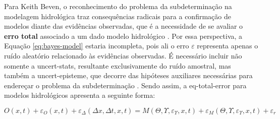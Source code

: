\documentclass[./main.tex]{subfiles}
\begin{document}
\par Para Keith Beven, o reconhecimento do problema da subdeterminação na modelagem hidrológica traz consequências radicais para a confirmação de modelos diante das evidências observadas, que é a necessidade de se avaliar o \textbf{erro total} associado a um dado modelo hidrológico \cite{Beven2005}. Por essa perspectiva, a Equação \eqref{eq:bayes-model} estaria incompleta, pois ali o erro $\varepsilon$ representa apenas o ruído aleatório relacionado às evidências observadas. É necessário incluir não somente a \gls{uncert-stats}, resultante exclusivamente do ruído amostral, mas também a \gls{uncert-episteme}, que decorre das hipóteses auxiliares necessárias para endereçar o problema da subdeterminação \cite{Beven2016}. Sendo assim, a \gls{eq-total-error} para modelos hidrológicos apresenta a seguinte forma:
\begin{linenomath*}
\begin{equation}
\label{eq:total-error}
    O(x, t) + \varepsilon_{O}(x, t) + \varepsilon_{\Delta}(\Delta x,\Delta t, x, t) = M(\Theta, \Upsilon, \varepsilon_{\Upsilon}, x, t) + \varepsilon_{M}(\Theta, \Upsilon, \varepsilon_{\Upsilon}, x, t) + \varepsilon_r
\end{equation}
\end{linenomath*}
\end{document}
